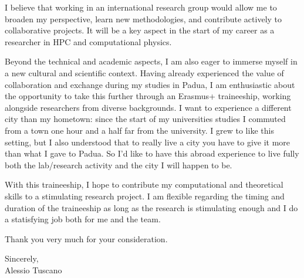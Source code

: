 \documentclass[a4paper,11pt]{article}
\begin{document}

I believe that working in an international research group would allow me to broaden my perspective, learn new methodologies, and contribute actively to collaborative projects. It will be a key aspect in the start of my career as a researcher in HPC and computational physics.

Beyond the technical and academic aspects, I am also eager to immerse myself in a new cultural and scientific context. Having already experienced the value of collaboration and exchange during my studies in Padua, I am enthusiastic about the opportunity to take this further through an Erasmus+ traineeship, working alongside researchers from diverse backgrounds. I want to experience a different city than my hometown: since the start of my universities studies I commuted from a town one hour and a half far from the university. I grew to like this setting, but I also understood that to really live a city you have to give it more than what I gave to Padua. So I'd like to have this abroad experience to live fully both the lab/research activity and the city I will happen to be.

With this traineeship, I hope to contribute my computational and theoretical skills to a stimulating research project. I am flexible regarding the timing and duration of the traineeship as long as the research is stimulating enough and I do a statisfying job both for me and the team.

Thank you very much for your consideration.


\vspace{1em}
\noindent
Sincerely,\\[.4em]
Alessio Tuscano
\end{document}
